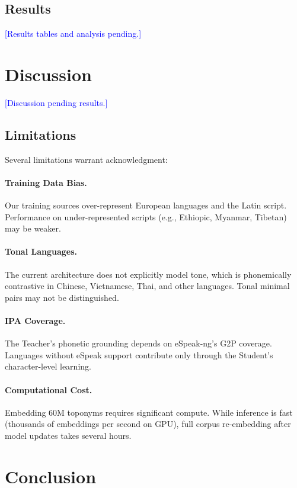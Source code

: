 \documentclass[11pt,a4paper]{article}
\newcommand{\placeholder}[1]{\textcolor{blue}{[#1]}}
\begin{document}
\subsection{Results}

\placeholder{Results tables and analysis pending.}


\section{Discussion}
\label{sec:discussion}

\placeholder{Discussion pending results.}

\subsection{Limitations}

Several limitations warrant acknowledgment:

\paragraph{Training Data Bias.} Our training sources over-represent European languages and the Latin script. Performance on under-represented scripts (e.g., Ethiopic, Myanmar, Tibetan) may be weaker.

\paragraph{Tonal Languages.} The current architecture does not explicitly model tone, which is phonemically contrastive in Chinese, Vietnamese, Thai, and other languages. Tonal minimal pairs may not be distinguished.

\paragraph{IPA Coverage.} The Teacher's phonetic grounding depends on eSpeak-ng's G2P coverage. Languages without eSpeak support contribute only through the Student's character-level learning.

\paragraph{Computational Cost.} Embedding 60M toponyms requires significant compute. While inference is fast (thousands of embeddings per second on GPU), full corpus re-embedding after model updates takes several hours.


\section{Conclusion}
\label{sec:conclusion}
\end{document}
